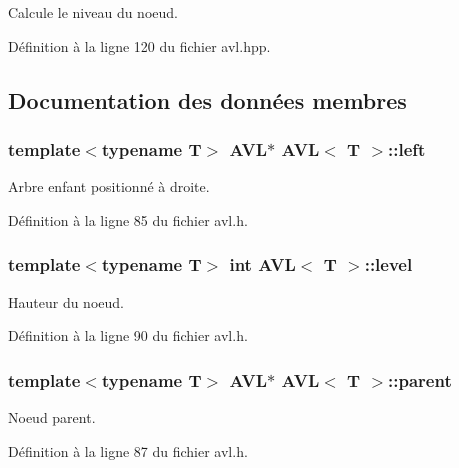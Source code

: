 Calcule le niveau du noeud. 



Définition à la ligne 120 du fichier avl.\-hpp.



\subsection{Documentation des données membres}
\hypertarget{class_a_v_l_aa1ea6df15798ce98461729e2b1deeb87}{
\subsubsection[{left}]{\setlength{\rightskip}{0pt plus 5cm}template$<$typename T$>$ {\bf A\-V\-L}$\ast$ {\bf A\-V\-L}$<$ T $>$\-::left}}\label{class_a_v_l_aa1ea6df15798ce98461729e2b1deeb87}


Arbre enfant positionné à droite. 



Définition à la ligne 85 du fichier avl.\-h.

\hypertarget{class_a_v_l_aa5309553367542c5683df0fae61bfc0a}{
\subsubsection[{level}]{\setlength{\rightskip}{0pt plus 5cm}template$<$typename T$>$ int {\bf A\-V\-L}$<$ T $>$\-::level\hspace{0.3cm}{\ttfamily [private]}}}\label{class_a_v_l_aa5309553367542c5683df0fae61bfc0a}


Hauteur du noeud. 



Définition à la ligne 90 du fichier avl.\-h.

\hypertarget{class_a_v_l_a3978c23794aa5e11eb37473e1cebe4e5}{
\subsubsection[{parent}]{\setlength{\rightskip}{0pt plus 5cm}template$<$typename T$>$ {\bf A\-V\-L}$\ast$ {\bf A\-V\-L}$<$ T $>$\-::parent}}\label{class_a_v_l_a3978c23794aa5e11eb37473e1cebe4e5}


Noeud parent. 



Définition à la ligne 87 du fichier avl.\-h.

